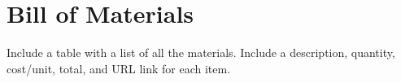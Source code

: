 \section{Bill of Materials}

Include a table with a list of all the materials. Include a description, quantity, cost/unit, total, and URL link for each item. 

